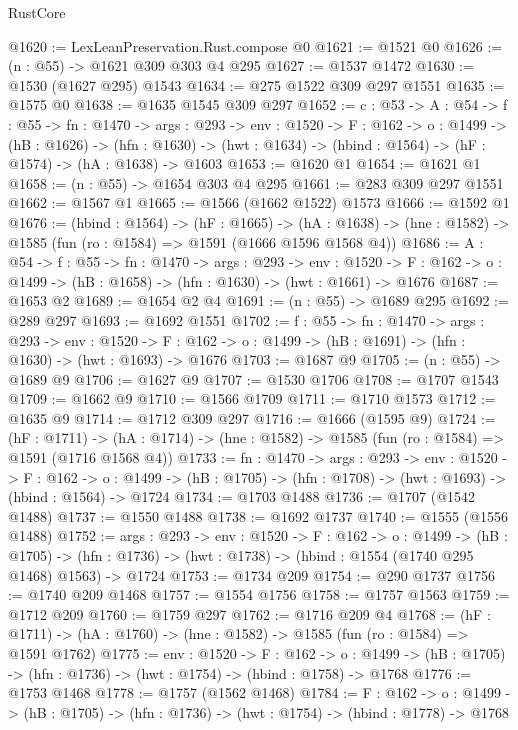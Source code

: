 \begin{lexlean}{RustCore}
\begin{coremodule}
@1620 := LexLeanPreservation.Rust.compose @0
@1621 := @1521 @0
@1626 := (n : @55) -> @1621 @309 @303 @4 @295
@1627 := @1537 @1472
@1630 := @1530 (@1627 @295) @1543
@1634 := @275 @1522 @309 @297 @1551
@1635 := @1575 @0
@1638 := @1635 @1545 @309 @297
@1652 := {c : @53} ->
  {A : @54} ->
  {f : @55} ->
  {fn : @1470} ->
  {args : @293} ->
  {env : @1520} ->
  {F : @162} ->
  {o : @1499} ->
  (hB : @1626) ->
  (hfn : @1630) -> (hwt : @1634) -> (hbind : @1564) -> (hF : @1574) -> (hA : @1638) -> @1603
@1653 := @1620 @1
@1654 := @1621 @1
@1658 := (n : @55) -> @1654 @303 @4 @295
@1661 := @283 @309 @297 @1551
@1662 := @1567 @1
@1665 := @1566 (@1662 @1522) @1573
@1666 := @1592 @1
@1676 := (hbind : @1564) ->
  (hF : @1665) ->
  (hA : @1638) -> (hne : @1582) -> @1585 (fun (ro : @1584) => @1591 (@1666 @1596 @1568 @4))
@1686 := {A : @54} ->
  {f : @55} ->
  {fn : @1470} ->
  {args : @293} ->
  {env : @1520} ->
  {F : @162} -> {o : @1499} -> (hB : @1658) -> (hfn : @1630) -> (hwt : @1661) -> @1676
@1687 := @1653 @2
@1689 := @1654 @2 @4
@1691 := (n : @55) -> @1689 @295
@1692 := @289 @297
@1693 := @1692 @1551
@1702 := {f : @55} ->
  {fn : @1470} ->
  {args : @293} ->
  {env : @1520} ->
  {F : @162} -> {o : @1499} -> (hB : @1691) -> (hfn : @1630) -> (hwt : @1693) -> @1676
@1703 := @1687 @9
@1705 := (n : @55) -> @1689 @9
@1706 := @1627 @9
@1707 := @1530 @1706
@1708 := @1707 @1543
@1709 := @1662 @9
@1710 := @1566 @1709
@1711 := @1710 @1573
@1712 := @1635 @9
@1714 := @1712 @309 @297
@1716 := @1666 (@1595 @9)
@1724 := (hF : @1711) ->
  (hA : @1714) -> (hne : @1582) -> @1585 (fun (ro : @1584) => @1591 (@1716 @1568 @4))
@1733 := {fn : @1470} ->
  {args : @293} ->
  {env : @1520} ->
  {F : @162} ->
  {o : @1499} -> (hB : @1705) -> (hfn : @1708) -> (hwt : @1693) -> (hbind : @1564) -> @1724
@1734 := @1703 @1488
@1736 := @1707 (@1542 @1488)
@1737 := @1550 @1488
@1738 := @1692 @1737
@1740 := @1555 (@1556 @1488)
@1752 := {args : @293} ->
  {env : @1520} ->
  {F : @162} ->
  {o : @1499} ->
  (hB : @1705) ->
  (hfn : @1736) -> (hwt : @1738) -> (hbind : @1554 (@1740 @295 @1468) @1563) -> @1724
@1753 := @1734 @209
@1754 := @290 @1737
@1756 := @1740 @209 @1468
@1757 := @1554 @1756
@1758 := @1757 @1563
@1759 := @1712 @209
@1760 := @1759 @297
@1762 := @1716 @209 @4
@1768 := (hF : @1711) -> (hA : @1760) -> (hne : @1582) -> @1585 (fun (ro : @1584) => @1591 @1762)
@1775 := {env : @1520} ->
  {F : @162} ->
  {o : @1499} -> (hB : @1705) -> (hfn : @1736) -> (hwt : @1754) -> (hbind : @1758) -> @1768
@1776 := @1753 @1468
@1778 := @1757 (@1562 @1468)
@1784 := {F : @162} ->
  {o : @1499} -> (hB : @1705) -> (hfn : @1736) -> (hwt : @1754) -> (hbind : @1778) -> @1768

\end{coremodule}
\end{lexlean}
